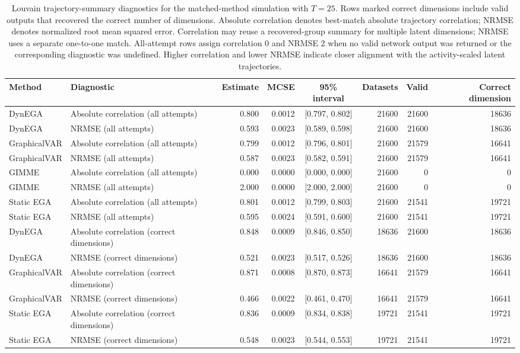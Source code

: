 \documentclass[
]{article}
\begin{document}
\begin{landscape}
\begin{table}
\caption{\label{tab:trajectory-t25}Louvain trajectory-summary diagnostics for the matched-method simulation with $T=25$. Rows marked correct dimensions include valid outputs that recovered the correct number of dimensions. Absolute correlation denotes best-match absolute trajectory correlation; NRMSE denotes normalized root mean squared error. Correlation may reuse a recovered-group summary for multiple latent dimensions; NRMSE uses a separate one-to-one match. All-attempt rows assign correlation 0 and NRMSE 2 when no valid network output was returned or the corresponding diagnostic was undefined. Higher correlation and lower NRMSE indicate closer alignment with the activity-scaled latent trajectories.}
\centering
\begin{tabular}[t]{p{1.00in}p{2.85in}rrcrrr}
\toprule
Method & Diagnostic & Estimate & MCSE & 95\% interval & Datasets & Valid & Correct dimension\\
\midrule
DynEGA & Absolute correlation (all attempts) & 0.800 & 0.0012 & {}[0.797, 0.802] & 21600 & 21600 & 18636\\
DynEGA & NRMSE (all attempts) & 0.593 & 0.0023 & {}[0.589, 0.598] & 21600 & 21600 & 18636\\
GraphicalVAR & Absolute correlation (all attempts) & 0.799 & 0.0012 & {}[0.796, 0.801] & 21600 & 21579 & 16641\\
GraphicalVAR & NRMSE (all attempts) & 0.587 & 0.0023 & {}[0.582, 0.591] & 21600 & 21579 & 16641\\
GIMME & Absolute correlation (all attempts) & 0.000 & 0.0000 & {}[0.000, 0.000] & 21600 & 0 & 0\\
\addlinespace
GIMME & NRMSE (all attempts) & 2.000 & 0.0000 & {}[2.000, 2.000] & 21600 & 0 & 0\\
Static EGA & Absolute correlation (all attempts) & 0.801 & 0.0012 & {}[0.799, 0.803] & 21600 & 21541 & 19721\\
Static EGA & NRMSE (all attempts) & 0.595 & 0.0024 & {}[0.591, 0.600] & 21600 & 21541 & 19721\\
DynEGA & Absolute correlation (correct dimensions) & 0.848 & 0.0009 & {}[0.846, 0.850] & 18636 & 21600 & 18636\\
DynEGA & NRMSE (correct dimensions) & 0.521 & 0.0023 & {}[0.517, 0.526] & 18636 & 21600 & 18636\\
\addlinespace
GraphicalVAR & Absolute correlation (correct dimensions) & 0.871 & 0.0008 & {}[0.870, 0.873] & 16641 & 21579 & 16641\\
GraphicalVAR & NRMSE (correct dimensions) & 0.466 & 0.0022 & {}[0.461, 0.470] & 16641 & 21579 & 16641\\
Static EGA & Absolute correlation (correct dimensions) & 0.836 & 0.0009 & {}[0.834, 0.838] & 19721 & 21541 & 19721\\
Static EGA & NRMSE (correct dimensions) & 0.548 & 0.0023 & {}[0.544, 0.553] & 19721 & 21541 & 19721\\
\bottomrule
\end{tabular}
\end{table}
\clearpage
\normalsize\end{landscape}
\end{document}
